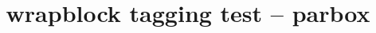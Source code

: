 \documentclass{article}
\title{wrapblock tagging test -- parbox}
\begin{document}
\kant[1]
\begin{wrapblock}{\parbox{0.3\textwidth}{\kant[5][1-2]}}
\kant[2-3]
\end{wrapblock}
\kant[4]
\end{document}
